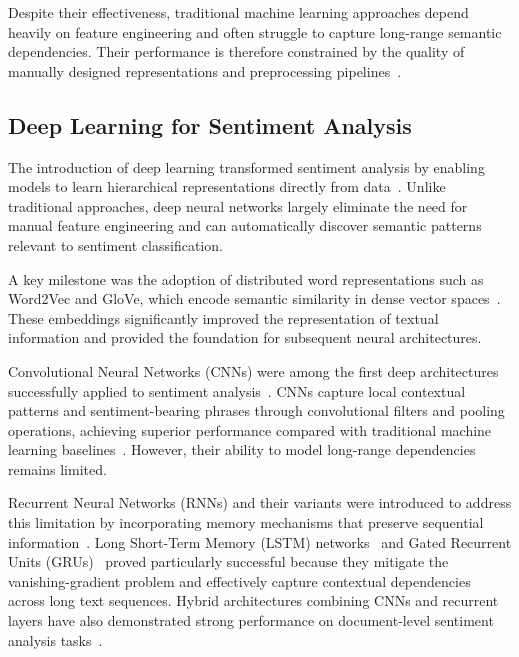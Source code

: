 \documentclass[a4paper,fleqn]{cas-dc}
\begin{document}
Despite their effectiveness, traditional machine learning approaches depend heavily on feature engineering and often struggle to capture long-range semantic dependencies. Their performance is therefore constrained by the quality of manually designed representations and preprocessing pipelines~\cite{ain2017sentiment}.

\subsection{Deep Learning for Sentiment Analysis}

The introduction of deep learning transformed sentiment analysis by enabling models to learn hierarchical representations directly from data~\cite{ain2017sentiment, sharma2025review}. Unlike traditional approaches, deep neural networks largely eliminate the need for manual feature engineering and can automatically discover semantic patterns relevant to sentiment classification.

A key milestone was the adoption of distributed word representations such as Word2Vec and GloVe, which encode semantic similarity in dense vector spaces~\cite{pennington2014glove, DeSantis2023prototype}. These embeddings significantly improved the representation of textual information and provided the foundation for subsequent neural architectures.

Convolutional Neural Networks (CNNs) were among the first deep architectures successfully applied to sentiment analysis~\cite{Collobert2008unified}. CNNs capture local contextual patterns and sentiment-bearing phrases through convolutional filters and pooling operations, achieving superior performance compared with traditional machine learning baselines~\cite{Paredes2017sentiment}. However, their ability to model long-range dependencies remains limited.

Recurrent Neural Networks (RNNs) and their variants were introduced to address this limitation by incorporating memory mechanisms that preserve sequential information~\cite{sharma2025review}. Long Short-Term Memory (LSTM) networks~\cite{hochreiter1997long} and Gated Recurrent Units (GRUs)~\cite{cho2014learning} proved particularly successful because they mitigate the vanishing-gradient problem and effectively capture contextual dependencies across long text sequences. Hybrid architectures combining CNNs and recurrent layers have also demonstrated strong performance on document-level sentiment analysis tasks~\cite{Tang2015document}.
\end{document}
